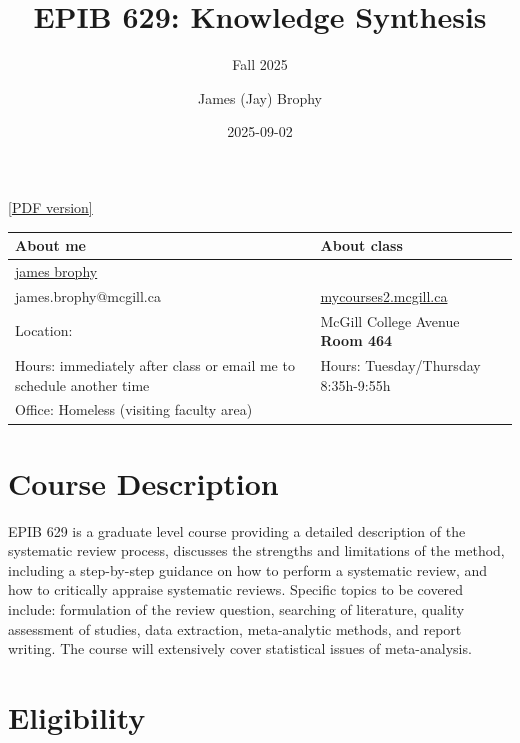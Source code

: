 \documentclass[
  letterpaper,
  DIV=11,
  numbers=noendperiod]{scrartcl}
\title{EPIB 629: Knowledge Synthesis}
\subtitle{Fall 2025}
\author{James (Jay) Brophy}
\date{2025-09-02}
\begin{document}
\maketitle


\href{}{{[}PDF version{]}}

\begin{longtable}[]{@{}
  >{\raggedright\arraybackslash}p{}
  >{\raggedright\arraybackslash}p{}@{}}
\toprule\noalign{}
\begin{minipage}[b]{\linewidth}\raggedright
\textbf{About me}
\end{minipage} & \begin{minipage}[b]{\linewidth}\raggedright
\textbf{About class}
\end{minipage} \\
\midrule\noalign{}
\endhead
\bottomrule\noalign{}
\endlastfoot
\href{https://brophyj.com}{james brophy} & \\
james.brophy@mcgill.ca &
\href{https://mycourses2.mcgill.ca/d2l/home/770484}{mycourses2.mcgill.ca} \\
Location: & 2001 McGill College Avenue \textbf{Room 464} \\
Hours: immediately after class or email me to schedule another time &
Hours: Tuesday/Thursday 8:35h-9:55h \\
Office: Homeless (visiting faculty area) & \\
\end{longtable}

\section{Course Description}\label{course-description}

EPIB 629 is a graduate level course providing a detailed description of
the systematic review process, discusses the strengths and limitations
of the method, including a step-by-step guidance on how to perform a
systematic review, and how to critically appraise systematic reviews.
Specific topics to be covered include: formulation of the review
question, searching of literature, quality assessment of studies, data
extraction, meta-analytic methods, and report writing. The course will
extensively cover statistical issues of meta-analysis.

\section{Eligibility}\label{eligibility}
\end{document}
